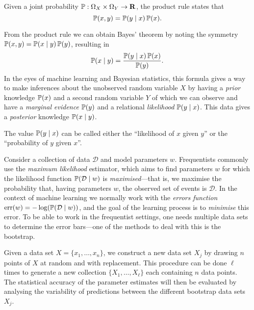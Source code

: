 \begin{lemma}
    \label{lem:joint-probability-product-rule}
    Given a joint probability \(\operatorname{\mathbb{P}}: \Omega_X \times \Omega_Y \to \mathbf{R}\), the product
    rule states that
    \[
        \operatorname{\mathbb{P}}(x, y) = \operatorname{\mathbb{P}}(y \mid x) \operatorname{\mathbb{P}}(x).
    \]
\end{lemma}

From the product rule we can obtain Bayes' theorem by noting the symmetry
\(\operatorname{\mathbb{P}}(x, y) = \operatorname{\mathbb{P}}(x \mid y) \operatorname{\mathbb{P}}(y)\), resulting in
\[
    \operatorname{\mathbb{P}}(x \mid y) = \frac{\operatorname{\mathbb{P}}(y \mid x) \operatorname{\mathbb{P}}(x)}{\operatorname{\mathbb{P}}(y)}.
\]
In the eyes of machine learning and Bayesian statistics, this formula gives a
way to make inferences about the unobserved random variable \(X\) by having a
\emph{prior} knowledge \(\operatorname{\mathbb{P}}(x)\) and a second random variable \(Y\) of which we
can observe and have a \emph{marginal evidence} \(\operatorname{\mathbb{P}}(y)\) and a relational
\emph{likelihood} \(\operatorname{\mathbb{P}}(y \mid x)\). This data gives a \emph{posterior} knowledge
\(\operatorname{\mathbb{P}}(x \mid y)\).

\begin{remark}
    \label{rem:likelihood}
    The value \(\operatorname{\mathbb{P}}(y \mid x)\) can be called either the ``likelihood of \(x\) given
    \(y\)'' or the ``probability of \(y\) given \(x\)''.
\end{remark}

Consider a collection of data \(\mathcal{D}\) and model parameters
\(w\). Frequentists commonly use the \emph{maximum likelihood} estimator, which
aims to find parameters \(w\) for which the likelihood function
\(\operatorname{\mathbb{P}}(\mathcal{D} \mid w)\) is \emph{maximised}---that is, we maximise the
probability that, having parameters \(w\), the observed set of events is
\(\mathcal{D}\). In the context of machine learning we normally work
with the \emph{errors function}
\(\operatorname{err}(w) = -\log(\operatorname{\mathbb{P}}(\mathcal{D} \mid w))\), and the goal of
the learning process is to \emph{minimise} this error. To be able to work in the
frequentist settings, one needs multiple data sets to determine the error
bars---one of the methods to deal with this is the bootstrap.

\begin{definition}
    \label{def:bootstrap-data-sets}
    Given a data set \(X = \{x_1, \dots, x_n\}\), we construct a new data set
    \(X_j\) by drawing \(n\) points of \(X\) at random and with replacement. This
    procedure can be done \(\ell\) times to generate a new collection \(\{X_1,
    \dots, X_{\ell}\}\) each containing \(n\) data points. The statistical accuracy
    of the parameter estimates will then be evaluated by analysing the variability
    of predictions between the different bootstrap data sets \(X_j\).
\end{definition}


